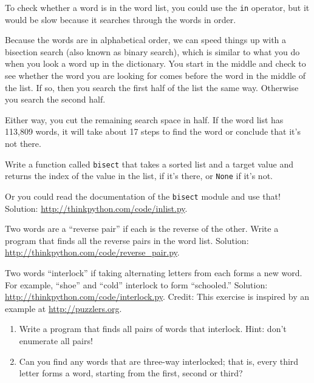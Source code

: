 \documentclass[10pt]{book}
\begin{document}
\begin{CJK}{UTF8}{gbsn}
\begin{exercise}
To check whether a word is in the word list, you could use
the {\tt in} operator, but it would be slow because it searches
through the words in order.

Because the words are in alphabetical order, we can speed things up
with a bisection search (also known as binary search), which is
similar to what you do when you look a word up in the dictionary.  You
start in the middle and check to see whether the word you are looking
for comes before the word in the middle of the list.  If so, then you
search the first half of the list the same way.  Otherwise you search
the second half.

Either way, you cut the remaining search space in half.  If the
word list has 113,809 words, it will take about 17 steps to
find the word or conclude that it's not there.

Write a function called {\tt bisect} that takes a sorted list
and a target value and returns the index of the value
in the list, if it's there, or {\tt None} if it's not.

Or you could read the documentation of the {\tt bisect} module
and use that!  Solution: \url{http://thinkpython.com/code/inlist.py}.

\end{exercise}

\begin{exercise}

Two words are a ``reverse pair'' if each is the reverse of the
other.  Write a program that finds all the reverse pairs in the
word list.  Solution: \url{http://thinkpython.com/code/reverse_pair.py}.

\end{exercise}

\begin{exercise}

Two words ``interlock'' if taking alternating letters from each forms
a new word.  For example, ``shoe'' and ``cold''
interlock to form ``schooled.''
Solution: \url{http://thinkpython.com/code/interlock.py}.
Credit: This exercise is inspired by an example at \url{http://puzzlers.org}.

\begin{enumerate}

\item Write a program that finds all pairs of words that interlock.
  Hint: don't enumerate all pairs!

\item Can you find any words that are three-way interlocked; that is,
  every third letter forms a word, starting from the first, second or
  third?


\end{enumerate}
\end{exercise}
\end{CJK}
\end{document}
